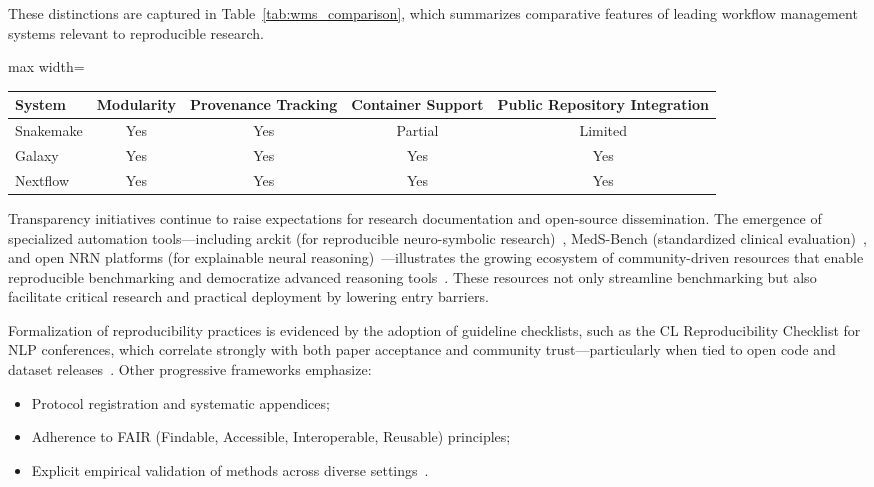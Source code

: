 \documentclass[sigconf]{acmart}
\begin{document}
These distinctions are captured in Table~\ref{tab:wms_comparison}, which summarizes comparative features of leading workflow management systems relevant to reproducible research.

\begin{table*}[htbp]
\centering
\caption{Comparative features of widely used workflow management systems supporting reproducible research.}
\label{tab:wms_comparison}
\begin{adjustbox}{max width=\textwidth}
\begin{tabular}{lcccc}
\toprule
\textbf{System} & \textbf{Modularity} & \textbf{Provenance Tracking} & \textbf{Container Support} & \textbf{Public Repository Integration} \\
\midrule
Snakemake & Yes & Yes & Partial & Limited \\
Galaxy    & Yes & Yes & Yes     & Yes    \\
Nextflow  & Yes & Yes & Yes     & Yes    \\
\bottomrule
\end{tabular}
\end{adjustbox}
\end{table*}

Transparency initiatives continue to raise expectations for research documentation and open-source dissemination. The emergence of specialized automation tools---including arckit (for reproducible neuro-symbolic research)~\cite{ref92}, MedS-Bench (standardized clinical evaluation)~\cite{ref95}, and open NRN platforms (for explainable neural reasoning)~\cite{ref93}---illustrates the growing ecosystem of community-driven resources that enable reproducible benchmarking and democratize advanced reasoning tools~\cite{ref65,ref66,ref67,ref71,ref81,ref82,ref87,ref101,ref102,ref104,ref105}. These resources not only streamline benchmarking but also facilitate critical research and practical deployment by lowering entry barriers.

Formalization of reproducibility practices is evidenced by the adoption of guideline checklists, such as the CL Reproducibility Checklist for NLP conferences, which correlate strongly with both paper acceptance and community trust---particularly when tied to open code and dataset releases~\cite{ref108}. Other progressive frameworks emphasize:

\begin{itemize}
  \item Protocol registration and systematic appendices;
  \item Adherence to FAIR (Findable, Accessible, Interoperable, Reusable) principles;
  \item Explicit empirical validation of methods across diverse settings~\cite{ref66,ref67,ref82}.
\end{itemize}
\end{document}
